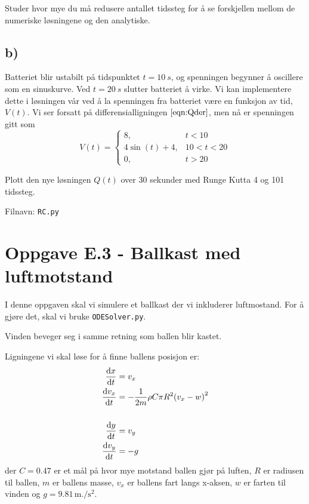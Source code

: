 \documentclass[10pt,a4paper]{article}
\begin{document}
Studer hvor mye du må redusere antallet tidssteg for å se forskjellen mellom de numeriske løsningene og den analytiske.
	
\subsection*{b)}
Batteriet blir ustabilt på tidspunktet $t=\SI{10}{s}$, og spenningen begynner å oscillere som en sinuskurve. Ved $t = \SI{20}{s}$ slutter batteriet å virke. Vi kan implementere dette i løsningen vår ved å la spenningen fra batteriet være en funksjon av tid, $V(t)$. Vi ser forsatt på differensialligningen $\ref{eqn:Qder}$, men nå er spenningen gitt som
\begin{equation}
V(t) =
\begin{cases}
8,           &t < 10 \\
4\sin(t)+4,  &10 < t < 20 \\
0,           &t > 20
\end{cases}
\end{equation}

Plott den nye løsningen $Q(t)$ over 30 sekunder med Runge Kutta 4 og 101 tidssteg.

Filnavn: \texttt{RC.py}



\section*{Oppgave E.3 - Ballkast med luftmotstand}
I denne oppgaven skal vi simulere et ballkast der vi inkluderer luftmostand. 
For å gjøre det, skal vi bruke \texttt{ODESolver.py}.

Vinden beveger seg i samme retning som ballen blir kastet. 

Ligningene vi skal løse for å finne ballens posisjon er:
\begin{align*}
	\dv{x}{t} &= v_x \\
	\dv{v_x}{t} &= -\frac{1}{2m}\rho C \pi R^2 \qty(v_x - w)^2 \\
	\hfill \\
	\dv{y}{t} &= v_y \\
	\dv{v_y}{t} &= -g
\end{align*}
der $C = 0.47$ er et mål på hvor mye motstand ballen gjør på luften, $R$ er  radiusen til ballen, $m$ er ballens masse, $v_x$ er ballens fart langs x-aksen, $w$ er farten til vinden og $g = 9.81\,\si{\meter.\per\square\second}$.
\end{document}
